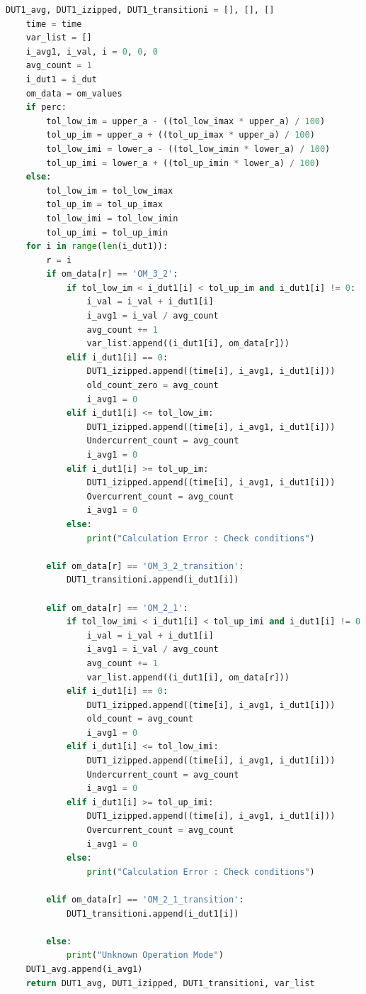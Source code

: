 \begin{lstlisting}[language = Python]
    DUT1_avg, DUT1_izipped, DUT1_transitioni = [], [], []
    time = time
    var_list = []
    i_avg1, i_val, i = 0, 0, 0
    avg_count = 1
    i_dut1 = i_dut
    om_data = om_values
    if perc:
        tol_low_im = upper_a - ((tol_low_imax * upper_a) / 100)
        tol_up_im = upper_a + ((tol_up_imax * upper_a) / 100)
        tol_low_imi = lower_a - ((tol_low_imin * lower_a) / 100)
        tol_up_imi = lower_a + ((tol_up_imin * lower_a) / 100)
    else:
        tol_low_im = tol_low_imax
        tol_up_im = tol_up_imax
        tol_low_imi = tol_low_imin
        tol_up_imi = tol_up_imin
    for i in range(len(i_dut1)):
        r = i
        if om_data[r] == 'OM_3_2':
            if tol_low_im < i_dut1[i] < tol_up_im and i_dut1[i] != 0:
                i_val = i_val + i_dut1[i]
                i_avg1 = i_val / avg_count
                avg_count += 1
                var_list.append((i_dut1[i], om_data[r]))
            elif i_dut1[i] == 0:
                DUT1_izipped.append((time[i], i_avg1, i_dut1[i]))
                old_count_zero = avg_count
                i_avg1 = 0
            elif i_dut1[i] <= tol_low_im:
                DUT1_izipped.append((time[i], i_avg1, i_dut1[i]))
                Undercurrent_count = avg_count
                i_avg1 = 0
            elif i_dut1[i] >= tol_up_im:
                DUT1_izipped.append((time[i], i_avg1, i_dut1[i]))
                Overcurrent_count = avg_count
                i_avg1 = 0
            else:
                print("Calculation Error : Check conditions")
 
        elif om_data[r] == 'OM_3_2_transition':
            DUT1_transitioni.append(i_dut1[i])
 
        elif om_data[r] == 'OM_2_1':
            if tol_low_imi < i_dut1[i] < tol_up_imi and i_dut1[i] != 0:
                i_val = i_val + i_dut1[i]
                i_avg1 = i_val / avg_count
                avg_count += 1
                var_list.append((i_dut1[i], om_data[r]))
            elif i_dut1[i] == 0:
                DUT1_izipped.append((time[i], i_avg1, i_dut1[i]))
                old_count = avg_count
                i_avg1 = 0
            elif i_dut1[i] <= tol_low_imi:
                DUT1_izipped.append((time[i], i_avg1, i_dut1[i]))
                Undercurrent_count = avg_count
                i_avg1 = 0
            elif i_dut1[i] >= tol_up_imi:
                DUT1_izipped.append((time[i], i_avg1, i_dut1[i]))
                Overcurrent_count = avg_count
                i_avg1 = 0
            else:
                print("Calculation Error : Check conditions")
 
        elif om_data[r] == 'OM_2_1_transition':
            DUT1_transitioni.append(i_dut1[i])
 
        else:
            print("Unknown Operation Mode")
    DUT1_avg.append(i_avg1)
    return DUT1_avg, DUT1_izipped, DUT1_transitioni, var_list
\end{lstlisting}

